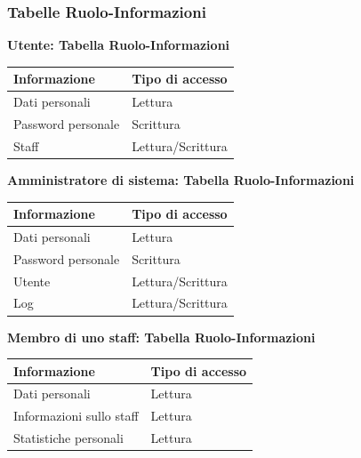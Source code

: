 \documentclass[a4paper]{article}
\begin{document}
\newpage

\subsubsection{Tabelle Ruolo-Informazioni}

\textbf{Utente: Tabella Ruolo-Informazioni}

\begin{center}
    \begin{tabularx}{1\textwidth}{|X|X|}
    \hline
    \textbf{Informazione} & \textbf{Tipo di accesso} \\
    \hline
    \hline
    Dati personali & Lettura\\
    \hline
    Password personale & Scrittura\\
    \hline
    Staff & Lettura/Scrittura\\
    \hline
    \end{tabularx}
\end{center}

\textbf{Amministratore di sistema: Tabella Ruolo-Informazioni}

\begin{center}
    \begin{tabularx}{1\textwidth}{|X|X|}
    \hline
    \textbf{Informazione} & \textbf{Tipo di accesso} \\
    \hline
    \hline
    Dati personali & Lettura\\
    \hline
    Password personale & Scrittura\\
    \hline
    Utente & Lettura/Scrittura\\
    \hline
    Log & Lettura/Scrittura\\
    \hline
    \end{tabularx}
\end{center}

\textbf{Membro di uno staff: Tabella Ruolo-Informazioni}

\begin{center}
    \begin{tabularx}{1\textwidth}{|X|X|}
    \hline
    \textbf{Informazione} & \textbf{Tipo di accesso} \\
    \hline
    \hline
    Dati personali & Lettura\\
    \hline
    Informazioni sullo staff & Lettura\\
    \hline
    Statistiche personali & Lettura\\
    \hline
    \end{tabularx}
\end{center}
\end{document}

